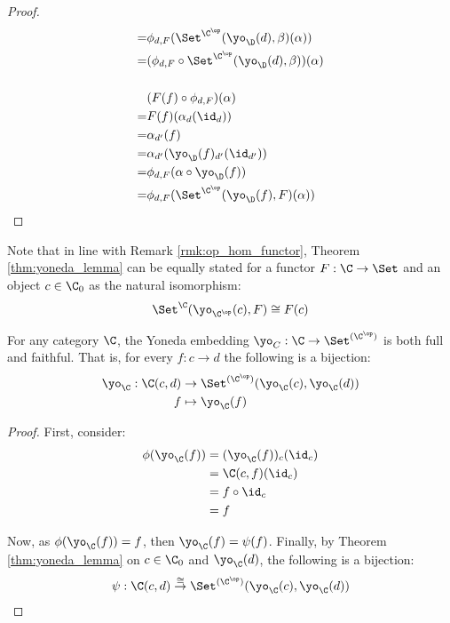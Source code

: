 \begin{theorem}
\begin{proof}
\[\begin{aligned}
        =& \phi_{d, F}(\Set^{\C^\op}(\yo_\D(d), \beta)(\alpha))\\
        =& (\phi_{d, F} \circ \Set^{\C^\op}(\yo_\D(d), \beta)) (\alpha)\\
        \\
        &(F(f)\circ \phi_{d, F}) (\alpha)\\
        =& F(f)(\alpha_d (\id_d))\\
        =& \alpha_{d'}(f)\\
        =& \alpha_{d'}(\yo_\D(f)_{d'}(\id_{d'}))\\
        =& \phi_{d, F}(\alpha \circ \yo_\D(f))\\
        =& \phi_{d, F}(\Set^{\C^\op}(\yo_\D(f), F)(\alpha))
      \end{aligned}
    \]
  \end{proof}
\end{theorem}

\begin{remark}
  Note that in line with Remark \ref{rmk:op_hom_functor}, Theorem
  \ref{thm:yoneda_lemma} can be equally stated for a functor $F:\C \to \Set$ and
  an object $c\in\C_0$ as the natural isomorphism:
  \[\Set^{\C}(\yo_{\C^\op}(c), F) \cong F(c)\]
\end{remark}

\begin{theorem}\label{thm:yoneda_full_faithful}
  For any category $\C$, the Yoneda embedding $\yo_C: \C \to \Set^{(\C^\op)}$ is
  both full and faithful. That is, for every $f: c\to d$ the following is a
  bijection:
  \[
    \begin{aligned}
      \yo_\C: \C(c, d) &\to \Set^{(\C^\op)}(\yo_\C(c), \yo_\C(d))\\
      f &\mapsto \yo_\C(f)
    \end{aligned}
  \]

  \begin{proof}
    First, consider:
    \[
      \begin{aligned}
        \phi(\yo_\C(f))
        &= (\yo_\C(f))_c(\id_c)\\
        &= \C(c, f) (\id_c)\\
        &= f \circ \id_c\\
        &= f
      \end{aligned}
    \]

    Now, as $\phi(\yo_\C(f)) = f$, then $\yo_\C(f) = \psi(f)$. Finally, by
    Theorem \ref{thm:yoneda_lemma} on $c\in\C_0$ and $\yo_\C(d)$, the following
    is a bijection:
    \[\psi: \C(c,d) \overset{\cong}{\to} \Set^{(\C^\op)}(\yo_\C(c), \yo_\C(d))\]
  \end{proof}
\end{theorem}

